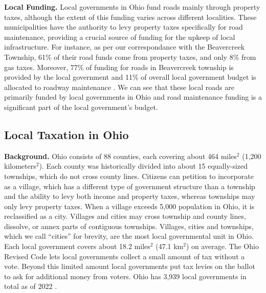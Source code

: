{\bf Local Funding.} Local governments in Ohio fund roads mainly through property taxes, although the extent of this funding varies across different localities. These municipalities have the authority to levy property taxes specifically for road maintenance, providing a crucial source of funding for the upkeep of local infrastructure. For instance, as per our correspondance with the Beavercreek Township, 61\% of their road funds come from property taxes, and only 8\% from gas taxes. Moreover, 77\% of funding for roads in Beavercreek township is provided by the local government and 11\% of overall local government budget is allocated to roadway maintenance \citep{schroeder2025}. We can see that these local roads are primarily funded by local governments in Ohio and road maintenance funding is a significant part of the local government's budget.


\subsection{Local Taxation in Ohio}

{\bf Background.} Ohio consists of 88 counties, each covering about 464 miles$^2$ (1,200 kilometers$^2$). Each county was historically divided into about 15 equally-sized townships, which do not cross county lines. Citizens can petition to incorporate as a village, which has a different type of government structure than a township and the ability to levy both income and property taxes, whereas townships may only levy property taxes. When a village exceeds 5,000 population in Ohio, it is reclassified as a city. Villages and cities may cross township and county lines, dissolve, or annex parts of contiguous townships. Villages, cities and townships, which we call “cities” for brevity, are the most local governmental unit in Ohio. Each local government covers about 18.2 miles$^2$ (47.1 km$^2$) on average. The Ohio Revised Code lets local governments collect a small amount of tax without a vote. Beyond this limited amount local governments put tax levies on the ballot to ask for additional money from voters. Ohio has 3,939 local governments in total as of 2022 \citep{stlouisfed2024local}.  

